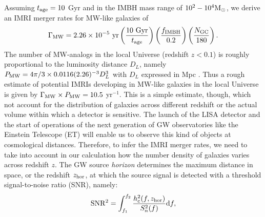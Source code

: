 \documentclass[twocolumn]{aastex62}
\newcommand{\Ms}{{\rm M}_\odot}
\newcommand{\gc}{{\rm GC}}
\newcommand{\ibh}{{\rm IMBH}}
\begin{document}
%
%
%
Assuming $t_{\rm age} = 10$ Gyr and in the IMBH mass range of $10^2 - 10^4\Ms$, we derive an IMRI merger rates for MW-like galaxies of
\begin{equation}
\Gamma_{\rm MW} = 2.26\times 10^{-5} {\rm ~yr} \left(\frac{10{\rm ~Gyr}}{t_{\rm age}}\right)\left(\frac{f_\ibh}{0.2}\right)\left(\frac{N_\gc}{180}\right).
\end{equation}
The number of MW-analogs in the local Universe (redshift $z<0.1$) is roughly proportional to the luminosity distance $D_L$, namely $P_{\rm MW} = 4\pi/3 \times 0.0116(2.26)^{-3}D_L^3$ with $D_L$ expressed in Mpc \citep{abadie10}. Thus a rough estimate of potential IMRIs developing in MW-like galaxies in the local Universe is given by $\Gamma_{\rm MW} \times P_{\rm MW} = 10.5$ yr$^{-1}$.
This is a simple estimate, though, which not account for the distribution of galaxies across different redshift or the actual volume within which a detector is sensitive.
The launch of the LISA detector and the start of operations of the next generation of GW observatories like the Einstein Telescope (ET) will enable us to observe this kind of objects at cosmological distances. Therefore, to infer the IMRI merger rates, we need to take into account in our calculation how the number density of galaxies varies across redshift $z$.
The GW source {\it horizon} determines the maximum distance in space, or the redshift $z_{\rm hor}$, at which the source signal is detected with a threshold signal-to-noise ratio (SNR), namely:
\begin{equation}
{\rm SNR^2} = \int_{f_1}^{f_2} \displaystyle{\frac{h_c^2(f,z_{\rm hor})}{S_n^2(f)}} {\rm d}f,
\end{equation}
\end{document}
